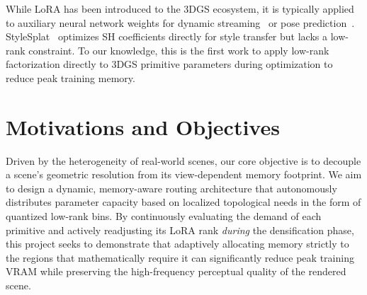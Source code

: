 \documentclass[sigconf]{acmart}
\begin{document}
While LoRA has been introduced to the 3DGS ecosystem, it is typically applied 
to auxiliary neural network weights for dynamic streaming~\cite{lr4dgstream} or 
pose prediction~\cite{ufvsplatter}. StyleSplat~\cite{stylesplat} optimizes SH 
coefficients directly for style transfer but lacks a low-rank constraint. To 
our knowledge, this is the first work to apply low-rank factorization directly 
to 3DGS primitive parameters during optimization to reduce peak training memory.

\section{Motivations and Objectives}
\label{sec:goal}
Driven by the heterogeneity of real-world scenes, our core objective is to 
decouple a scene's geometric resolution from its view-dependent memory 
footprint. We aim to design a dynamic, memory-aware routing architecture that 
autonomously distributes parameter capacity based on localized topological 
needs in the form of quantized low-rank bins. By continuously evaluating 
the demand of each primitive and actively readjusting its LoRA rank 
\emph{during} the densification phase, this project seeks to demonstrate that 
adaptively allocating memory strictly to the regions that mathematically 
require it can significantly reduce peak training VRAM while preserving the 
high-frequency perceptual quality of the rendered scene.

\end{document}
